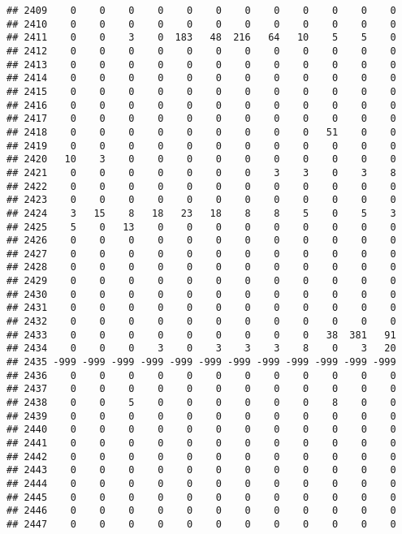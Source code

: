 \documentclass[]{article}
\begin{document}
\begin{verbatim}
## 2409    0    0    0    0    0    0    0    0    0    0    0    0
## 2410    0    0    0    0    0    0    0    0    0    0    0    0
## 2411    0    0    3    0  183   48  216   64   10    5    5    0
## 2412    0    0    0    0    0    0    0    0    0    0    0    0
## 2413    0    0    0    0    0    0    0    0    0    0    0    0
## 2414    0    0    0    0    0    0    0    0    0    0    0    0
## 2415    0    0    0    0    0    0    0    0    0    0    0    0
## 2416    0    0    0    0    0    0    0    0    0    0    0    0
## 2417    0    0    0    0    0    0    0    0    0    0    0    0
## 2418    0    0    0    0    0    0    0    0    0   51    0    0
## 2419    0    0    0    0    0    0    0    0    0    0    0    0
## 2420   10    3    0    0    0    0    0    0    0    0    0    0
## 2421    0    0    0    0    0    0    0    3    3    0    3    8
## 2422    0    0    0    0    0    0    0    0    0    0    0    0
## 2423    0    0    0    0    0    0    0    0    0    0    0    0
## 2424    3   15    8   18   23   18    8    8    5    0    5    3
## 2425    5    0   13    0    0    0    0    0    0    0    0    0
## 2426    0    0    0    0    0    0    0    0    0    0    0    0
## 2427    0    0    0    0    0    0    0    0    0    0    0    0
## 2428    0    0    0    0    0    0    0    0    0    0    0    0
## 2429    0    0    0    0    0    0    0    0    0    0    0    0
## 2430    0    0    0    0    0    0    0    0    0    0    0    0
## 2431    0    0    0    0    0    0    0    0    0    0    0    0
## 2432    0    0    0    0    0    0    0    0    0    0    0    0
## 2433    0    0    0    0    0    0    0    0    0   38  381   91
## 2434    0    0    0    3    0    3    3    3    8    0    3   20
## 2435 -999 -999 -999 -999 -999 -999 -999 -999 -999 -999 -999 -999
## 2436    0    0    0    0    0    0    0    0    0    0    0    0
## 2437    0    0    0    0    0    0    0    0    0    0    0    0
## 2438    0    0    5    0    0    0    0    0    0    8    0    0
## 2439    0    0    0    0    0    0    0    0    0    0    0    0
## 2440    0    0    0    0    0    0    0    0    0    0    0    0
## 2441    0    0    0    0    0    0    0    0    0    0    0    0
## 2442    0    0    0    0    0    0    0    0    0    0    0    0
## 2443    0    0    0    0    0    0    0    0    0    0    0    0
## 2444    0    0    0    0    0    0    0    0    0    0    0    0
## 2445    0    0    0    0    0    0    0    0    0    0    0    0
## 2446    0    0    0    0    0    0    0    0    0    0    0    0
## 2447    0    0    0    0    0    0    0    0    0    0    0    0

\end{verbatim}
\end{document}
